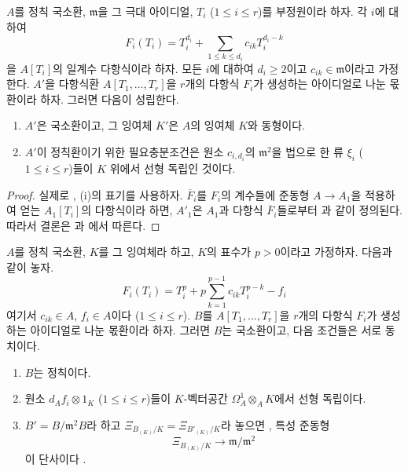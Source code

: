 \begin{corollary}[22.5.3]
\label{0.22.5.3-ko}
$A$를 정칙 국소환, $\mathfrak m$을 그 극대 아이디얼,
$T_i$ ($1\leqslant i\leqslant r$)를 부정원이라 하자. 각 $i$에 대하여
\begin{equation}
\label{0.22.5.3.1-ko}
  F_i(T_i)=T_i^{d_i}+\sum_{1\leqslant k\leqslant d_i}c_{ik}T_i^{d_i-k}
  \tag{22.5.3.1}
\end{equation}
을 $A[T_i]$의 일계수 다항식이라 하자. 모든 $i$에 대하여
$d_i\geqslant2$이고 $c_{ik}\in\mathfrak m$이라고 가정한다. $A'$을
다항식환 $A[T_1,\ldots,T_r]$을 $r$개의 다항식 $F_i$가 생성하는
아이디얼로 나눈 몫환이라 하자. 그러면 다음이 성립한다.
\begin{enumerate}
  \item[\rm(i)] $A'$은 국소환이고, 그 잉여체 $K'$은 $A$의 잉여체
  $K$와 동형이다.
  \item[\rm(ii)] $A'$이 정칙환이기 위한 필요충분조건은 원소
  $c_{i,d_i}$의 $\mathfrak m^2$을 법으로 한 류 $\xi_i$
  ($1\leqslant i\leqslant r$)들이 $K$ 위에서 선형 독립인 것이다.
\end{enumerate}
\end{corollary}

\begin{proof}
실제로 , (i)의 표기를 사용하자. $\overline F_i$를
$F_i$의 계수들에 준동형 $A\longrightarrow A_1$을 적용하여 얻는
$A_1[T_i]$의 다항식이라 하면, $A'_1$은 $A_1$과 다항식
$\overline F_i$들로부터 과 같이 정의된다. 따라서
결론은 과 에서 따른다.
\end{proof}

\begin{theorem}[22.5.4]
\label{0.22.5.4-ko}
$A$를 정칙 국소환, $K$를 그 잉여체라 하고, $K$의 표수가
$p>0$이라고 가정하자. 다음과 같이 놓자.
\begin{equation}
\label{0.22.5.4.1-ko}
  F_i(T_i)=T_i^p+p\sum_{k=1}^{p-1}c_{ik}T_i^{p-k}-f_i
  \tag{22.5.4.1}
\end{equation}
여기서 $c_{ik}\in A$, $f_i\in A$이다
($1\leqslant i\leqslant r$). $B$를 $A[T_1,\ldots,T_r]$을 $r$개의
다항식 $F_i$가 생성하는 아이디얼로 나눈 몫환이라 하자. 그러면
$B$는 국소환이고, 다음 조건들은 서로 동치이다.
\begin{enumerate}
  \item[a)] $B$는 정칙이다.
  \item[b)] 원소 $d_Af_i\otimes1_K$ ($1\leqslant i\leqslant r$)들이
  $K$-벡터공간 $\Omega^1_A\otimes_AK$에서 선형 독립이다.
  \item[c)] $B'=B/\mathfrak m^2B$라 하고
  $\Xi_{B_{(K)}/K}=\Xi_{B'_{(K)}/K}$라 놓으면
  , 특성 준동형
  \[
    \Xi_{B_{(K)}/K}\longrightarrow\mathfrak m/\mathfrak m^2
  \]
  이 단사이다 .
\end{enumerate}
\end{theorem}

